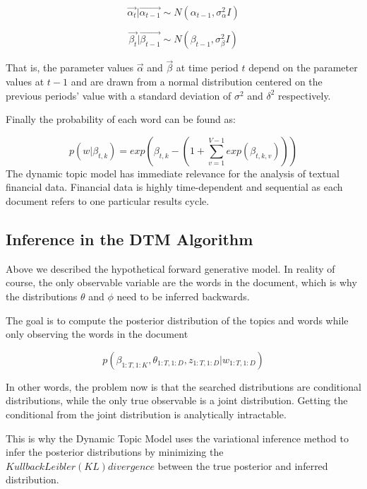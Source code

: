 \documentclass[12pt,journal,letterpaper,oneside,onecolumn]{IEEEtran}
\begin{document}
\begin{equation}
\vec{\alpha_{t}} | \vec{\alpha_{t-1}} \sim N (\alpha_{t-1}, \sigma_{\alpha}^2 I )
\end{equation}

\begin{equation}
\vec{\beta_{t}} | \vec{\beta_{t-1}} \sim N (\beta_{t-1}, \sigma_{\beta}^2 I )
\end{equation}

That is, the parameter values $\vec{\alpha}$ and $\vec{\beta}$ at time period $t$ depend on the parameter values at $t-1$  and are drawn from a normal distribution centered on the previous periods' value with a standard deviation of $\sigma^2$ and $\delta^2$ respectively.

Finally the probability of each word can be found as:

\begin{equation}
p(w| \beta_{t,k}) = exp(\beta_{t,k} - (1+ \sum_{v=1}^{V-1} exp(\beta_{t,k,v})))
\end{equation}
The dynamic topic model has immediate relevance for the analysis of textual financial data. Financial data is highly time-dependent and sequential as each document refers to one particular results cycle.


\subsection{Inference in the DTM Algorithm}

Above we described the hypothetical forward generative model.
In reality of course, the only observable variable are the words in the document, which is why the distributions $\theta$ and $\phi$ need to be inferred backwards.

The goal is to compute the posterior distribution  of the topics and words while only observing the words in the document

\begin{equation}
p(\beta_{1:T, 1:K}, \theta_{1:T, 1:D}, z_{1:T, 1:D} | w_{1:T, 1:D})
\end{equation}


In other words, the problem now is that the searched distributions are conditional distributions, while the only true observable is a joint distribution. Getting the conditional from the joint distribution is analytically intractable.

This is why the Dynamic Topic Model uses the variational inference method to infer the posterior distributions by minimizing the $Kullback Leibler (KL) divergence$ between the true posterior and inferred distribution.
\end{document}
